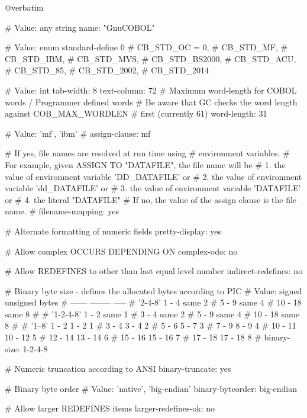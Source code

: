@verbatim


# Value: any string
name: "GnuCOBOL"

# Value: enum
standard-define			0
#        CB_STD_OC = 0,
#        CB_STD_MF,
#        CB_STD_IBM,
#        CB_STD_MVS,
#        CB_STD_BS2000,
#        CB_STD_ACU,
#        CB_STD_85,
#        CB_STD_2002,
#        CB_STD_2014

# Value: int
tab-width:			8
text-column:			72
# Maximum word-length for COBOL words / Programmer defined words
# Be aware that GC checks the word length against COB_MAX_WORDLEN
# first (currently 61)
word-length:			31

# Value: 'mf', 'ibm'
#
assign-clause:			mf

# If yes, file names are resolved at run time using
# environment variables.
# For example, given ASSIGN TO "DATAFILE", the file name will be
#  1. the value of environment variable 'DD_DATAFILE' or
#  2. the value of environment variable 'dd_DATAFILE' or
#  3. the value of environment variable 'DATAFILE' or
#  4. the literal "DATAFILE"
# If no, the value of the assign clause is the file name.
#
filename-mapping:		yes

# Alternate formatting of numeric fields
pretty-display:			yes

# Allow complex OCCURS DEPENDING ON
complex-odo:			no

# Allow REDEFINES to other than last equal level number
indirect-redefines:		no

# Binary byte size - defines the allocated bytes according to PIC
# Value:         signed  unsigned  bytes
#                ------  --------  -----
# '2-4-8'        1 -  4    same        2
#                5 -  9    same        4
#               10 - 18    same        8
#
# '1-2-4-8'      1 -  2    same        1
#                3 -  4    same        2
#                5 -  9    same        4
#               10 - 18    same        8
#
# '1--8'         1 -  2    1 -  2      1
#                3 -  4    3 -  4      2
#                5 -  6    5 -  7      3
#                7 -  9    8 -  9      4
#               10 - 11   10 - 12      5
#               12 - 14   13 - 14      6
#               15 - 16   15 - 16      7
#               17 - 18   17 - 18      8
#
binary-size:			1-2-4-8

# Numeric truncation according to ANSI
binary-truncate:		yes

# Binary byte order
# Value: 'native', 'big-endian'
binary-byteorder:		big-endian

# Allow larger REDEFINES items
larger-redefines-ok:		no

